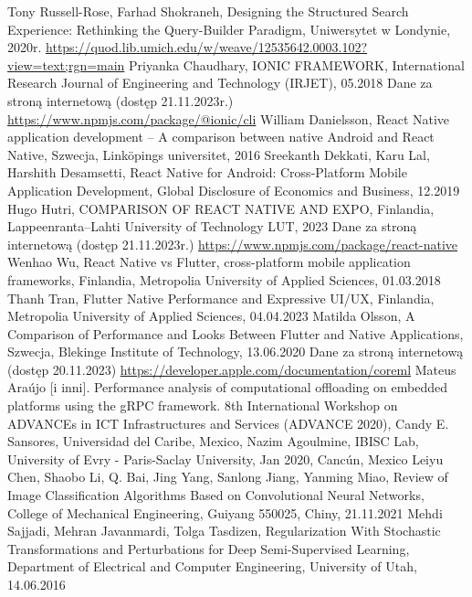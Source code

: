 \documentclass[12pt, a4paper, twoside, openany]{book}
\begin{document}
\begin{thebibliography}{9}
    Tony Russell-Rose, Farhad Shokraneh, Designing the Structured Search Experience: Rethinking the Query-Builder Paradigm, Uniwersytet w Londynie, 2020r. \url{https://quod.lib.umich.edu/w/weave/12535642.0003.102?view=text;rgn=main}
     Priyanka Chaudhary, IONIC FRAMEWORK, International Research Journal of Engineering and Technology (IRJET), 05.2018
     Dane za stroną internetową (dostęp 21.11.2023r.) \url{https://www.npmjs.com/package/@ionic/cli}
     William Danielsson, React Native application development – A comparison between native Android and React Native, Szwecja, Linköpings universitet, 2016
     Sreekanth Dekkati, Karu Lal, Harshith Desamsetti, React Native for Android: Cross-Platform Mobile Application Development, Global Disclosure of Economics and Business, 12.2019
     Hugo Hutri, COMPARISON OF REACT NATIVE AND EXPO, Finlandia, Lappeenranta–Lahti University of Technology LUT, 2023
     Dane za stroną internetową (dostęp 21.11.2023r.) \url{https://www.npmjs.com/package/react-native}
     Wenhao Wu, React Native vs Flutter, cross-platform mobile application frameworks, Finlandia, Metropolia University of Applied Sciences, 01.03.2018
     Thanh Tran, Flutter Native Performance and Expressive UI/UX, Finlandia, Metropolia University of Applied Sciences, 04.04.2023
     Matilda Olsson, A Comparison of Performance and Looks Between Flutter and Native Applications, Szwecja, Blekinge Institute of Technology, 13.06.2020
     Dane za stroną internetową (dostęp 20.11.2023) \url{https://developer.apple.com/documentation/coreml}
     Mateus Araújo [i inni]. Performance analysis of computational offloading on embedded platforms using the gRPC framework. 8th International Workshop on ADVANCEs in ICT Infrastructures and Services (ADVANCE 2020), Candy E. Sansores, Universidad del Caribe, Mexico, Nazim Agoulmine, IBISC Lab, University of Evry - Paris-Saclay University, Jan 2020, Cancún, Mexico
     Leiyu Chen, Shaobo Li, Q. Bai, Jing Yang, Sanlong Jiang, Yanming Miao, Review of Image Classification Algorithms Based on Convolutional Neural Networks, College of Mechanical Engineering, Guiyang 550025, Chiny, 21.11.2021
     Mehdi Sajjadi, Mehran Javanmardi, Tolga Tasdizen, Regularization With Stochastic Transformations and Perturbations for Deep Semi-Supervised Learning, Department of Electrical and Computer Engineering, University of Utah, 14.06.2016

\end{thebibliography}
\end{document}
